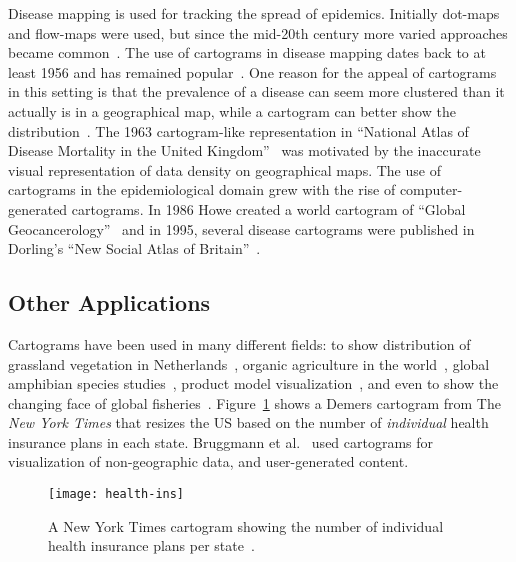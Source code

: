 \documentclass{egpubl}
\begin{document}
Disease mapping is used for tracking the spread of epidemics. Initially dot-maps and flow-maps were used, but since the mid-20th century more varied approaches became common~\cite{Manting}. 
The use of cartograms in disease mapping dates back to at least 1956 and has remained popular~\cite{bustamente1956geographical, levison1965area, hay2004global, bhatt2013global}. One reason for the appeal of cartograms in this setting is that the prevalence of a disease can seem more clustered than it actually is in a geographical map, while a cartogram can better show the distribution~\cite{kocmoud1997constructing}. 
The 1963 cartogram-like representation in ``National Atlas of Disease Mortality in the United Kingdom''~\cite{howe1963national} was motivated by the inaccurate visual representation of data density on geographical maps. 
The use of cartograms in the epidemiological domain grew with the rise of computer-generated cartograms. In 1986 Howe created a world cartogram of ``Global Geocancerology''~\cite{howe1986global} and in 1995, several disease cartograms were published in Dorling's ``New Social Atlas of Britain''~\cite{dorling1995new}.




\subsection{Other Applications}


Cartograms have been used in many different fields: to show distribution of grassland vegetation in Netherlands~\cite{de1956rough},  organic agriculture in the world~\cite{paull2013world}, global amphibian species studies~\cite{wake2008we}, product model visualization~\cite{tauscher2011area}, and even to show the changing face of global fisheries~\cite{watson2013changing}. 
Figure~\ref{fig:ins} shows a Demers cartogram from The \textit{New York Times} that resizes the US based on the number of {\em individual} health insurance plans in each state. Bruggmann et al.~\cite{bruggmann2013cartograms} used cartograms for visualization of non-geographic data, and user-generated content.





\begin{figure}[htbp]
\begin{center}
\texttt{[image: health-ins]}
\caption{A New York Times cartogram showing the number of individual health insurance plans per state~\cite{ins}.}
\label{fig:ins}
\end{center}
\end{figure} 
\end{document}

